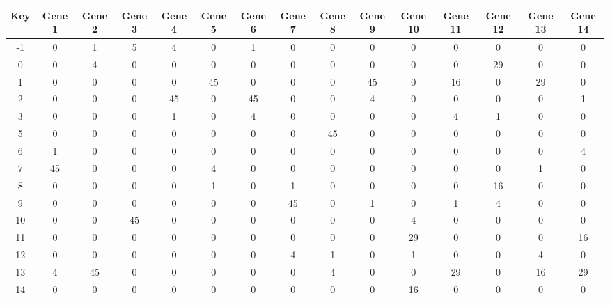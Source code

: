 \begin{tabular}{|c|c|c|c|c|c|c|c|c|c|c|c|c|c|c|}
\hline
Key & Gene 1 & Gene 2 & Gene 3 & Gene 4 & Gene 5 & Gene 6 & Gene 7 & Gene 8 & Gene 9 & Gene 10 & Gene 11 & Gene 12 & Gene 13 & Gene 14 \\
\hline
-1 & 0 & 1 & 5 & 4 & 0 & 1 & 0 & 0 & 0 & 0 & 0 & 0 & 0 & 0 \\
0 & 0 & 4 & 0 & 0 & 0 & 0 & 0 & 0 & 0 & 0 & 0 & 29 & 0 & 0 \\
1 & 0 & 0 & 0 & 0 & 45 & 0 & 0 & 0 & 45 & 0 & 16 & 0 & 29 & 0 \\
2 & 0 & 0 & 0 & 45 & 0 & 45 & 0 & 0 & 4 & 0 & 0 & 0 & 0 & 1 \\
3 & 0 & 0 & 0 & 1 & 0 & 4 & 0 & 0 & 0 & 0 & 4 & 1 & 0 & 0 \\
5 & 0 & 0 & 0 & 0 & 0 & 0 & 0 & 45 & 0 & 0 & 0 & 0 & 0 & 0 \\
6 & 1 & 0 & 0 & 0 & 0 & 0 & 0 & 0 & 0 & 0 & 0 & 0 & 0 & 4 \\
7 & 45 & 0 & 0 & 0 & 4 & 0 & 0 & 0 & 0 & 0 & 0 & 0 & 1 & 0 \\
8 & 0 & 0 & 0 & 0 & 1 & 0 & 1 & 0 & 0 & 0 & 0 & 16 & 0 & 0 \\
9 & 0 & 0 & 0 & 0 & 0 & 0 & 45 & 0 & 1 & 0 & 1 & 4 & 0 & 0 \\
10 & 0 & 0 & 45 & 0 & 0 & 0 & 0 & 0 & 0 & 4 & 0 & 0 & 0 & 0 \\
11 & 0 & 0 & 0 & 0 & 0 & 0 & 0 & 0 & 0 & 29 & 0 & 0 & 0 & 16 \\
12 & 0 & 0 & 0 & 0 & 0 & 0 & 4 & 1 & 0 & 1 & 0 & 0 & 4 & 0 \\
13 & 4 & 45 & 0 & 0 & 0 & 0 & 0 & 4 & 0 & 0 & 29 & 0 & 16 & 29 \\
14 & 0 & 0 & 0 & 0 & 0 & 0 & 0 & 0 & 0 & 16 & 0 & 0 & 0 & 0 \\
\hline
\end{tabular}